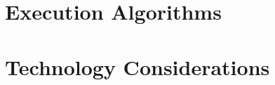 \documentclass[krantz1,ChapterTOCs]{krantz} %
\theoremstyle{plain}
\theoremstyle{custom}
\numberwithin{ex}{chapter}
\theoremstyle{remark}
\numberwithin{equation}{chapter}
\begin{document}
\part{Execution Algorithms}





\part{Technology Considerations}



%
%


\end{document}
